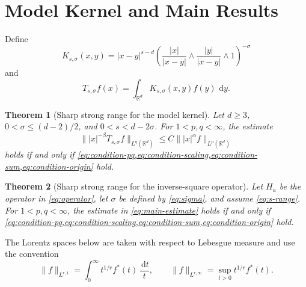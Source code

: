 \documentclass[11pt]{amsart}
\numberwithin{equation}{section}
\theoremstyle{plain}
\newtheorem{theorem}{Theorem}[section]
\theoremstyle{definition}
\theoremstyle{remark}
\newcommand{\RR}{\mathbb{R}}
\newcommand{\Ha}{H_a}
\newcommand{\dd}{\,\mathrm{d}}
\begin{document}
\section{Model Kernel and Main Results}
\label{sec:model-main}

Define
\begin{equation}
 K_{s,\sigma}(x,y)
 =|x-y|^{s-d}
 \left(
 \frac{|x|}{|x-y|}\wedge
 \frac{|y|}{|x-y|}\wedge1
 \right)^{-\sigma}
 \label{eq:model-kernel}
\end{equation}
and
\begin{equation}
 T_{s,\sigma}f(x)
 =\int_{\RR^d}K_{s,\sigma}(x,y)f(y)\,\dd y.
 \label{eq:model-operator}
\end{equation}

\begin{theorem}[Sharp strong range for the model kernel]
\label{thm:model-strong}
Let $d\ge3$, $0<\sigma\le(d-2)/2$, and $0<s<d-2\sigma$. For $1<p,q<\infty$, the estimate
\begin{equation}
 \bigl\||x|^{-\beta}T_{s,\sigma}f\bigr\|_{L^q(\RR^d)}
 \le C\bigl\||x|^\alpha f\bigr\|_{L^p(\RR^d)}
 \label{eq:model-strong}
\end{equation}
holds if and only if \cref{eq:condition-pq,eq:condition-scaling,eq:condition-sum,eq:condition-origin} hold.
\end{theorem}

\begin{theorem}[Sharp strong range for the inverse-square operator]
\label{thm:operator-strong}
Let $\Ha$ be the operator in \cref{eq:operator}, let $\sigma$ be defined by \cref{eq:sigma}, and assume \cref{eq:s-range}. For $1<p,q<\infty$, the estimate in \cref{eq:main-estimate} holds if and only if \cref{eq:condition-pq,eq:condition-scaling,eq:condition-sum,eq:condition-origin} hold.
\end{theorem}

The Lorentz spaces below are taken with respect to Lebesgue measure and use the convention
\begin{equation}
 \|f\|_{L^{r,1}}
 =\int_0^\infty t^{1/r}f^*(t)\,\frac{\dd t}{t},
 \qquad
 \|f\|_{L^{r,\infty}}
 =\sup_{t>0}t^{1/r}f^*(t).
 \label{eq:lorentz-convention}
\end{equation}
\end{document}
